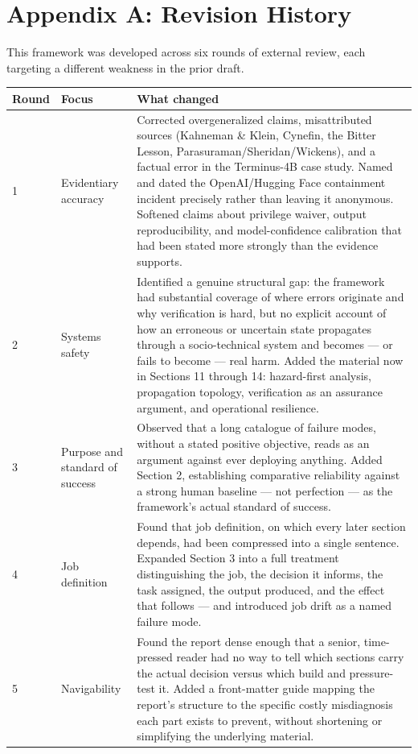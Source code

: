 \section*{Appendix A: Revision History}

This framework was developed across six rounds of external review, each targeting a different weakness in the prior draft.

\begin{center}
\begin{tabular}{|p{}|p{}|>{\small\raggedright\arraybackslash}p{}|}
\hline
Round & Focus & What changed \\
\hline
1 & Evidentiary accuracy & Corrected overgeneralized claims, misattributed sources (Kahneman \& Klein, Cynefin, the Bitter Lesson, Parasuraman/Sheridan/Wickens), and a factual error in the Terminus-4B case study. Named and dated the OpenAI/Hugging Face containment incident precisely rather than leaving it anonymous. Softened claims about privilege waiver, output reproducibility, and model-confidence calibration that had been stated more strongly than the evidence supports. \\
\hline
2 & Systems safety & Identified a genuine structural gap: the framework had substantial coverage of where errors originate and why verification is hard, but no explicit account of how an erroneous or uncertain state propagates through a socio-technical system and becomes --- or fails to become --- real harm. Added the material now in Sections 11 through 14: hazard-first analysis, propagation topology, verification as an assurance argument, and operational resilience. \\
\hline
3 & Purpose and standard of success & Observed that a long catalogue of failure modes, without a stated positive objective, reads as an argument against ever deploying anything. Added Section 2, establishing comparative reliability against a strong human baseline --- not perfection --- as the framework's actual standard of success. \\
\hline
4 & Job definition & Found that job definition, on which every later section depends, had been compressed into a single sentence. Expanded Section 3 into a full treatment distinguishing the job, the decision it informs, the task assigned, the output produced, and the effect that follows --- and introduced job drift as a named failure mode. \\
\hline
5 & Navigability & Found the report dense enough that a senior, time-pressed reader had no way to tell which sections carry the actual decision versus which build and pressure-test it. Added a front-matter guide mapping the report's structure to the specific costly misdiagnosis each part exists to prevent, without shortening or simplifying the underlying material. \\

\end{tabular}
\end{center}
